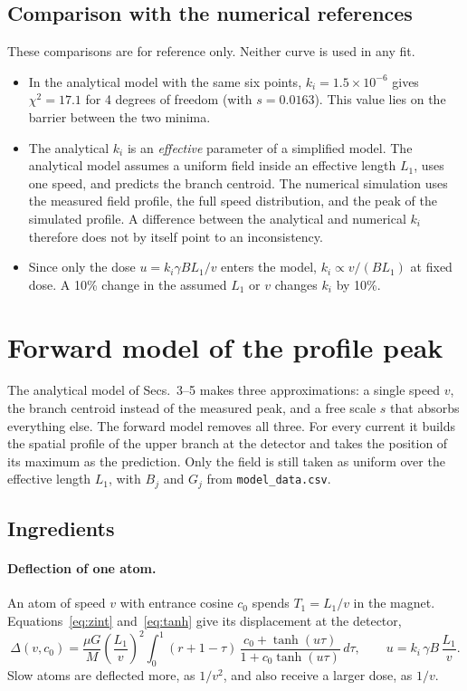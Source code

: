 \documentclass[11pt,a4paper]{article}
\newcommand{\kan}{k_i}
\begin{document}
\subsection{Comparison with the numerical references}
These comparisons are for reference only. Neither curve is used in any fit.
\begin{itemize}
\item In the analytical model with the same six points, $\kan = 1.5\times10^{-6}$ gives $\chi^2 = 17.1$ for 4 degrees of freedom (with $s = 0.0163$). This value lies on the barrier between the two minima.
\item The analytical $\kan$ is an \emph{effective} parameter of a simplified model. The analytical model assumes a uniform field inside an effective length $L_1$, uses one speed, and predicts the branch centroid. The numerical simulation uses the measured field profile, the full speed distribution, and the peak of the simulated profile. A difference between the analytical and numerical $\kan$ therefore does not by itself point to an inconsistency.
\item Since only the dose $u = \kan\gamma BL_1/v$ enters the model, $\kan\propto v/(BL_1)$ at fixed dose. A 10\% change in the assumed $L_1$ or $v$ changes $\kan$ by 10\%.
\end{itemize}

\section{Forward model of the profile peak}
\label{sec:forward}

The analytical model of Secs.~3--5 makes three approximations: a single speed $v$, the branch centroid instead of the measured peak, and a free scale $s$ that absorbs everything else. The forward model removes all three. For every current it builds the spatial profile of the upper branch at the detector and takes the position of its maximum as the prediction. Only the field is still taken as uniform over the effective length $L_1$, with $B_j$ and $G_j$ from \texttt{model\_data.csv}.

\subsection{Ingredients}

\paragraph{Deflection of one atom.} An atom of speed $v$ with entrance cosine $c_0$ spends $T_1 = L_1/v$ in the magnet. Equations~\eqref{eq:zint} and~\eqref{eq:tanh} give its displacement at the detector,
\begin{equation}
\Delta(v,c_0) = \frac{\mu G}{M}\left(\frac{L_1}{v}\right)^{\!2}\int_0^1 (r+1-\tau)\,\frac{c_0+\tanh(u\tau)}{1+c_0\tanh(u\tau)}\,d\tau,
\qquad u = \kan\,\gamma B\,\frac{L_1}{v}.
\label{eq:Delta}
\end{equation}
Slow atoms are deflected more, as $1/v^2$, and also receive a larger dose, as $1/v$.
\end{document}
